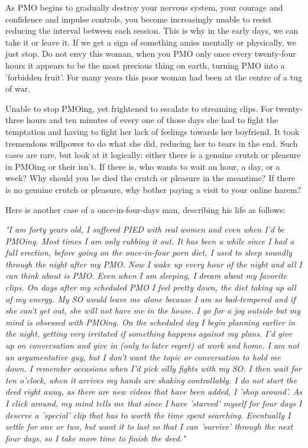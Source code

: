 As PMO begins to gradually destroy your nervous system, your courage and confidence and impulse controls, you become increasingly unable to resist reducing the interval between each session. This is why in the early days, we can take it or leave it. If we get a sign of something amiss mentally or physically, we just stop. Do not envy this woman, when you PMO only once every twenty-four hours it appears to be the most precious thing on earth, turning PMO into a 'forbidden fruit'. For many years this poor woman had been at the centre of a tug of war.

Unable to stop PMOing, yet frightened to escalate to streaming clips. For twenty-three hours and ten minutes of every one of those days she had to fight the temptation and having to fight her lack of feelings towards her boyfriend. It took tremendous willpower to do what she did, reducing her to tears in the end. Such cases are rare, but look at it logically: either there is a genuine crutch or pleasure in PMOing or their isn't. If there is, who wants to wait an hour, a day, or a week? Why should you be died the crutch or pleasure in the meantime? If there is no genuine crutch or pleasure, why bother paying a visit to your online harem?

  Here is another case of a once-in-four-days man, describing his life as follows:

  \textit{"I am forty years old, I suffered PIED with real women and even when I'd be PMOing. Most times I am only rubbing it out. It has been a while since I had a full erection, before going on the once-in-four porn diet, I used to sleep soundly through the night after my PMO. Now I wake up every hour of the night and all I can think about is PMO. Even when I am sleeping, I dream about my favorite clips. On days after my scheduled PMO I feel pretty down, the diet taking up all of my energy. My SO would leave me alone because I am so bad-tempered and if she can't get out, she will not have me in the house. I go for a jog outside but my mind is obsessed with PMOing. On the scheduled day I begin planning earlier in the night, getting very irritated if something happens against my plans. I'd give up on conversation and give in (only to later regret) at work and home. I am not an argumentative guy, but I don't want the topic or conversation to hold me down. I remember occasions when I'd pick silly fights with my SO. I then wait for ten o'clock, when it arrives my hands are shaking controllably. I do not start the deed right away, as there are new videos that have been added, I 'shop around'. As I click around, my mind tells me that since I have 'starved' myself for four days I deserve a 'special' clip that has to worth the time spent searching. Eventually I settle for one or two, but want it to last so that I can 'survive' through the next four days, so I take more time to finish the deed."}

